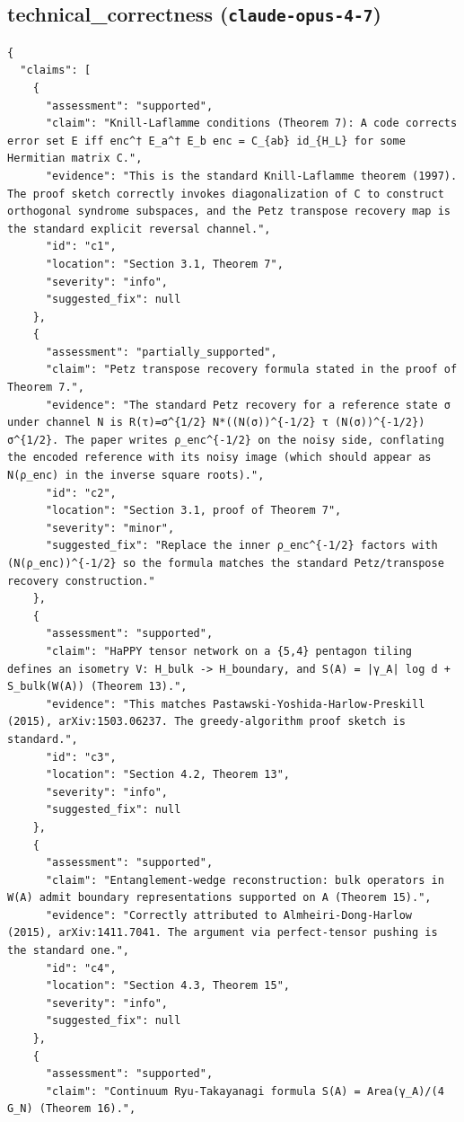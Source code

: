 \documentclass[11pt]{article}
\begin{document}
\subsection*{technical_correctness (\texttt{claude-opus-4-7})}
\begin{verbatim}
{
  "claims": [
    {
      "assessment": "supported",
      "claim": "Knill-Laflamme conditions (Theorem 7): A code corrects error set E iff enc^† E_a^† E_b enc = C_{ab} id_{H_L} for some Hermitian matrix C.",
      "evidence": "This is the standard Knill-Laflamme theorem (1997). The proof sketch correctly invokes diagonalization of C to construct orthogonal syndrome subspaces, and the Petz transpose recovery map is the standard explicit reversal channel.",
      "id": "c1",
      "location": "Section 3.1, Theorem 7",
      "severity": "info",
      "suggested_fix": null
    },
    {
      "assessment": "partially_supported",
      "claim": "Petz transpose recovery formula stated in the proof of Theorem 7.",
      "evidence": "The standard Petz recovery for a reference state σ under channel N is R(τ)=σ^{1/2} N*((N(σ))^{-1/2} τ (N(σ))^{-1/2}) σ^{1/2}. The paper writes ρ_enc^{-1/2} on the noisy side, conflating the encoded reference with its noisy image (which should appear as N(ρ_enc) in the inverse square roots).",
      "id": "c2",
      "location": "Section 3.1, proof of Theorem 7",
      "severity": "minor",
      "suggested_fix": "Replace the inner ρ_enc^{-1/2} factors with (N(ρ_enc))^{-1/2} so the formula matches the standard Petz/transpose recovery construction."
    },
    {
      "assessment": "supported",
      "claim": "HaPPY tensor network on a {5,4} pentagon tiling defines an isometry V: H_bulk -> H_boundary, and S(A) = |γ_A| log d + S_bulk(W(A)) (Theorem 13).",
      "evidence": "This matches Pastawski-Yoshida-Harlow-Preskill (2015), arXiv:1503.06237. The greedy-algorithm proof sketch is standard.",
      "id": "c3",
      "location": "Section 4.2, Theorem 13",
      "severity": "info",
      "suggested_fix": null
    },
    {
      "assessment": "supported",
      "claim": "Entanglement-wedge reconstruction: bulk operators in W(A) admit boundary representations supported on A (Theorem 15).",
      "evidence": "Correctly attributed to Almheiri-Dong-Harlow (2015), arXiv:1411.7041. The argument via perfect-tensor pushing is the standard one.",
      "id": "c4",
      "location": "Section 4.3, Theorem 15",
      "severity": "info",
      "suggested_fix": null
    },
    {
      "assessment": "supported",
      "claim": "Continuum Ryu-Takayanagi formula S(A) = Area(γ_A)/(4 G_N) (Theorem 16).",

\end{verbatim}
\end{document}
